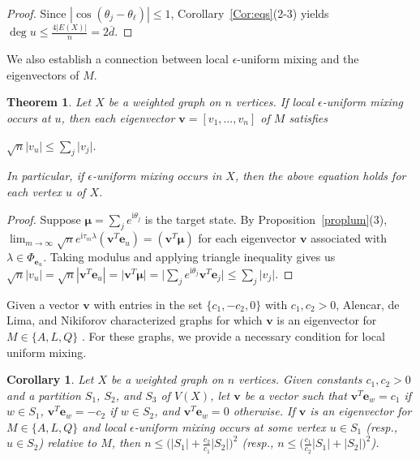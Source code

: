 \documentclass[11pt]{article}
\newtheorem{theorem}{Theorem}
\newtheorem{corollary}{Corollary}
\newcommand{\be}{\mathbf e}
\newcommand{\bv}{\mathbf v}
\newcommand{\bmu}{{\boldsymbol{\mu}}}
\def\ii{\mathrm{i}}
\newcommand{\supp}{{\Phi}}
\begin{document}
\begin{proof}
Since $|\cos(\theta_j-\theta_{\ell})|\leq 1$, Corollary~\ref{Cor:eqs}(2-3) yields $\operatorname{deg}u\leq \frac{4|E(X)|}{n}=2\overline{d}$.
\end{proof}

We also establish a connection between local $\epsilon$-uniform mixing and the eigenvectors of $M$. 

\begin{theorem}
\label{lum}
Let $X$ be a weighted graph on $n$ vertices. If local $\epsilon$-uniform mixing occurs at $u$, then each eigenvector $\mathbf{v}=[v_1,\ldots,v_n]$ of $M$ satisfies
\begin{center}
$\displaystyle\sqrt{n}|v_u|\leq\sum_{j}\big|v_j\big|.$
\end{center}
In particular, if $\epsilon$-uniform mixing occurs in $X$, then the above equation holds for each vertex $u$ of $X$.
\end{theorem}

\begin{proof}
Suppose $\bmu=\sum_{j}e^{\ii \theta_j}$ is the target state. By Proposition~\ref{proplum}(3), $\displaystyle\lim_{m\rightarrow\infty}\sqrt{n}e^{\ii\tau_m\lambda}(\bv^T\be_u)=(\bv^T\bmu)$ for each eigenvector $\bv$ associated with $\lambda\in\supp_{\be_u}$. Taking modulus and applying triangle inequality gives us $\sqrt{n}\left|v_u\right|=\sqrt{n}\left|\bv^T\be_u\right|=\big|\bv^T\bmu\big|=\big|\sum_{j}e^{\ii \theta_j}\bv^T\be_j\big|\leq \sum_{j}\big|v_j\big|$.
\end{proof}

Given a vector $\bv$ with entries in the set $\{c_1,-c_2,0\}$ with $c_1,c_2>0$, Alencar, de Lima, and Nikiforov characterized graphs for which $\bv$ is an eigenvector for $M\in\{A,L,Q\}$ \cite{alencar2023graphs}. For these graphs, we provide a necessary condition for local uniform mixing. 

\begin{corollary}
\label{Lima}
Let $X$ be a weighted graph on $n$ vertices. Given constants $c_1,c_2>0$ and a partition $S_{1}$, $S_{2}$, and $S_{3}$ of $V(X)$, let $\bv$ be a vector such that $\bv^T\be_w=c_1$ if $w\in S_1$, $\bv^T\be_w=-c_2$ if $w\in S_2$, and $\bv^T\be_w=0$ otherwise. If $\bv$ is an eigenvector for $M\in\{A,L,Q\}$ and local $\epsilon$-uniform mixing occurs at some vertex $u\in S_1$ (resp., $u\in S_2$) relative to $M$, then $n\leq \big(|S_1|+\frac{c_2}{c_1}|S_2|\big)^2$ (resp., $n\leq \big(\frac{c_1}{c_2}|S_1|+|S_2|\big)^2$).
\end{corollary}
\end{document}
